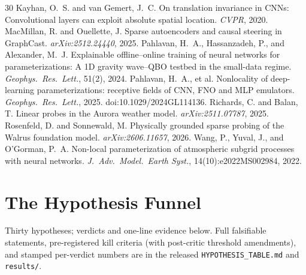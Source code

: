 \documentclass[10pt,twocolumn]{article}
\begin{document}
\begin{thebibliography}{30}
 Kayhan, O.~S. and van Gemert, J.~C. On translation invariance in CNNs: Convolutional layers can exploit absolute spatial location. \emph{CVPR}, 2020.
 MacMillan, R. and Ouellette, J. Sparse autoencoders and causal steering in GraphCast. \emph{arXiv:2512.24440}, 2025.
 Pahlavan, H.~A., Hassanzadeh, P., and Alexander, M.~J. Explainable offline--online training of neural networks for parameterizations: A 1D gravity wave--QBO testbed in the small-data regime. \emph{Geophys.\ Res.\ Lett.}, 51(2), 2024.
 Pahlavan, H.~A., et al. Nonlocality of deep-learning parameterizations: receptive fields of CNN, FNO and MLP emulators. \emph{Geophys.\ Res.\ Lett.}, 2025. doi:10.1029/2024GL114136.
 Richards, C. and Balan, T. Linear probes in the Aurora weather model. \emph{arXiv:2511.07787}, 2025.
 Rosenfeld, D. and Sonnewald, M. Physically grounded sparse probing of the Walrus foundation model. \emph{arXiv:2606.11657}, 2026.
 Wang, P., Yuval, J., and O'Gorman, P.~A. Non-local parameterization of atmospheric subgrid processes with neural networks. \emph{J.\ Adv.\ Model.\ Earth Syst.}, 14(10):e2022MS002984, 2022.
\end{thebibliography}

\appendix
\onecolumn
\section{The Hypothesis Funnel}\label{app:funnel}
Thirty hypotheses; verdicts and one-line evidence below. Full falsifiable statements, pre-registered kill criteria (with post-critic threshold amendments), and stamped per-verdict numbers are in the released \texttt{HYPOTHESIS\_TABLE.md} and \texttt{results/}.
\end{document}
